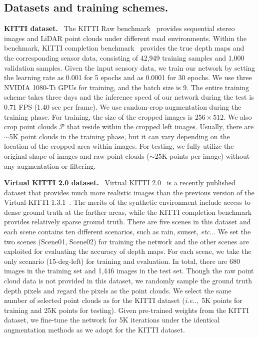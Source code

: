 \documentclass[letterpaper, 10 pt, conference]{ieeeconf}
\makeatletter
\DeclareRobustCommand\onedot{\futurelet\@let@token\@onedot}
\def\@onedot{\ifx\@let@token.\else.\null\fi\xspace}
\def\ie{\emph{i.e}\onedot} \def\Ie{{I.e}\onedot}
\def\etc{\emph{etc}\onedot} \def\vs{{vs}\onedot}
\makeatother
\begin{document}
\vspace{-1mm}
\subsection{Datasets and training schemes.}
\label{subsec:Datasets and training schemes.}

\noindent \textbf{KITTI dataset.} \
The KITTI Raw benchmark~\cite{kitti} provides sequential stereo images and LiDAR point clouds under different road environments. Within the benchmark, KITTI completion benchmark~\cite{kitti-completion} provides the true depth maps and the corresponding sensor data, consisting of 42,949 training samples and 1,000 validation samples. Given the input sensory data, we train our network by setting the learning rate as 0.001 for 5 epochs and as 0.0001 for 30 epochs. We use three NVIDIA 1080-Ti GPUs for training, and the batch size is 9. The entire training scheme takes three days and the inference speed of our network during the test is 0.71 FPS (1.40 sec per frame). We use random-crop augmentation during the training phase. For training, the size of the cropped images is $256 \times 512$.  We also crop point clouds $\mathcal{P}$ that reside within the cropped left images. Usually, there are $\sim$5K point clouds in the training phase, but it can vary depending on the location of the cropped area within images. For testing, we fully utilize the original shape of images and raw point clouds ($\sim$25K points per image) without any augmentation or filtering.


\noindent \textbf{Virtual KITTI 2.0 dataset.} \
Virtual KITTI 2.0~\cite{virtual-kitti} is a recently published dataset that provides much more realistic images than the previous version of the Virtual-KITTI 1.3.1~\cite{virtual-kitti-cvpr2016}. The merits of the synthetic environment include access to dense ground truth at the farther areas, while the KITTI completion benchmark~\cite{kitti-completion} provides relatively sparse ground truth. There are five scenes in this dataset and each scene contains ten different scenarios, such as rain, sunset, \etc. We set the two scenes (Scene01, Scene02) for training the network and the other scenes are exploited for evaluating the accuracy of depth maps. For each scene, we take the only scenario (15-deg-left) for training and evaluation. In total, there are 680 images in the training set and 1,446 images in the test set. Though the raw point cloud data is not provided in this dataset, we randomly sample the ground truth depth pixels and regard the pixels as the point clouds. We select the same number of selected point clouds as for the KITTI dataset (\ie,~5K points for training and 25K points for testing). 
Given pre-trained weights from the KITTI dataset, 
we fine-tune the network for 5K iterations under the identical augmentation methods as we adopt for the KITTI dataset.
\end{document}
